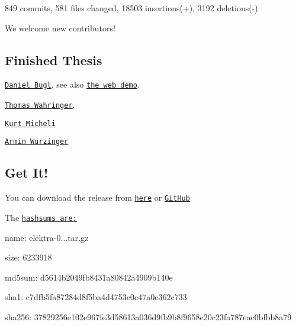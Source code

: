 849 commits, 581 files changed, 18503 insertions(+), 3192 deletions(-\/)

We welcome new contributors!

\subsection*{Finished Thesis}


\begin{DoxyItemize}
\item \href{https://www.libelektra.org/ftp/elektra/publications/bugl2018web.pdf}{\tt Daniel Bugl}, see also \href{https://webdemo.libelektra.org/}{\tt the web demo}.
\item \href{https://www.libelektra.org/ftp/elektra/publications/wahringer2018notification.pdf}{\tt Thomas Wahringer}.
\item \href{https://www.libelektra.org/ftp/elektra/publications/micheli2018hybrid.pdf}{\tt Kurt Micheli}
\item \href{https://catalogplus.tuwien.ac.at/primo_library/libweb/action/display.do?tabs=detailsTab&ct=display&fn=search&doc=UTW_alma7181921030003336&indx=1&recIds=UTW_alma7181921030003336}{\tt Armin Wurzinger}
\end{DoxyItemize}

\subsection*{Get It!}

You can download the release from \href{https://www.libelektra.org/ftp/elektra/releases/elektra-0.8.25.tar.gz}{\tt here} or \href{https://github.com/ElektraInitiative/ftp/blob/master/releases/elektra-0.8.25.tar.gz?raw=true}{\tt Git\+Hub}

The \href{https://github.com/ElektraInitiative/ftp/blob/master/releases/elektra-0.8.25.tar.gz.hashsum?raw=true}{\tt hashsums are\+:}


\begin{DoxyItemize}
\item name\+: elektra-\/0...\+tar.\+gz
\item size\+: 6233918
\item md5sum\+: d5614b2049fb8431a80842a4909b140e
\item sha1\+: c7dfb5fa87284d8f5ba4d4753e0e47a0e362c733
\item sha256\+: 37829256e102e967fe3d58613a036d9fb9b8f9658e20c23fa787eac0bfbb8a79
\end{DoxyItemize}

